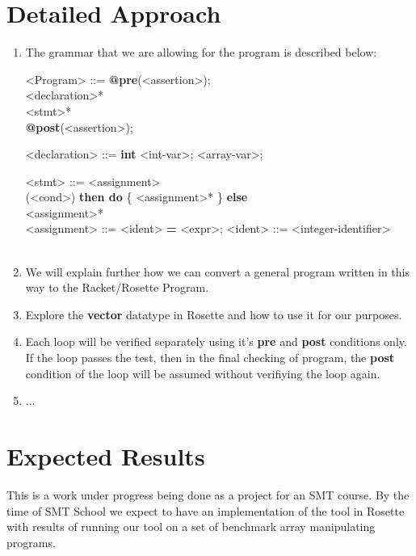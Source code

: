 \documentclass[letterpaper]{article} %
\begin{document}
\section {Detailed Approach}
\setlength{\grammarparsep}{20pt plus 1pt minus 1pt} %
\setlength{\grammarindent}{12em} %

\begin{enumerate}
	\item The grammar that we are allowing for the program is described below:
	\begin{grammar}
		<Program> ::=  {\bf @pre}(<assertion>);\\
		<declaration>*\\
		<stmt>*\\
		{\bf @post}(<assertion>);
		
		<declaration>  ::= {\bf int} <int-var>;
		 <array-var>;
		
		<stmt> ::= <assignment>\\
		 (<cond>) {\bf then do}
		\{
		<assignment>*
		\}
		{\bf else} {\\
			<assignment>*
		}\\
		
		<assignment>  ::= <ident> {\bf =} <expr>;		
		<ident>   ::= <integer-identifier>
		\alt <array-identifier>[<number>]
		\\
		\\
	\end{grammar}

	\item We will explain further how we can convert a general program written in this way to the Racket/Rosette Program. 
	
	\item Explore the {\bf vector} datatype in Rosette and how to use it for our purposes. 
	
	\item Each loop will be verified separately using it's {\bf pre} and {\bf post} conditions only. If the loop passes the test, then in the final checking of program, the {\bf post} condition of the loop will be assumed without verifiying the loop again. 
	
	\item ...
\end{enumerate}
\section{Expected Results}
This is a work under progress being done as a project for an SMT course.
By the time of SMT School we expect to have an implementation of the tool in Rosette with results of running our tool on a set of benchmark array manipulating programs.



\end{document}
